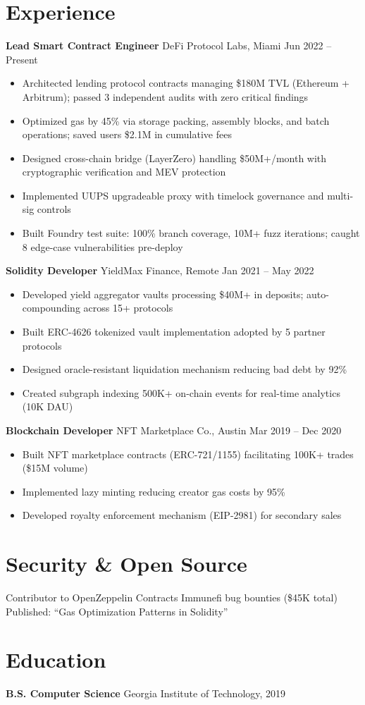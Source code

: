 \documentclass[10pt,a4paper]{article}
\begin{document}
\section{Experience}

\textbf{Lead Smart Contract Engineer} \quad\textbar\quad DeFi Protocol Labs, Miami \hfill Jun 2022 -- Present
\begin{itemize}
  \item Architected lending protocol contracts managing \$180M TVL (Ethereum + Arbitrum); passed 3 independent audits with zero critical findings
  \item Optimized gas by 45\% via storage packing, assembly blocks, and batch operations; saved users \$2.1M in cumulative fees
  \item Designed cross-chain bridge (LayerZero) handling \$50M+/month with cryptographic verification and MEV protection
  \item Implemented UUPS upgradeable proxy with timelock governance and multi-sig controls
  \item Built Foundry test suite: 100\% branch coverage, 10M+ fuzz iterations; caught 8 edge-case vulnerabilities pre-deploy
\end{itemize}

\textbf{Solidity Developer} \quad\textbar\quad YieldMax Finance, Remote \hfill Jan 2021 -- May 2022
\begin{itemize}
  \item Developed yield aggregator vaults processing \$40M+ in deposits; auto-compounding across 15+ protocols
  \item Built ERC-4626 tokenized vault implementation adopted by 5 partner protocols
  \item Designed oracle-resistant liquidation mechanism reducing bad debt by 92\%
  \item Created subgraph indexing 500K+ on-chain events for real-time analytics (10K DAU)
\end{itemize}

\textbf{Blockchain Developer} \quad\textbar\quad NFT Marketplace Co., Austin \hfill Mar 2019 -- Dec 2020
\begin{itemize}
  \item Built NFT marketplace contracts (ERC-721/1155) facilitating 100K+ trades (\$15M volume)
  \item Implemented lazy minting reducing creator gas costs by 95\%
  \item Developed royalty enforcement mechanism (EIP-2981) for secondary sales
\end{itemize}

\section{Security \& Open Source}
Contributor to OpenZeppelin Contracts \quad\textbar{} Immunefi bug bounties (\$45K total) \quad\textbar\quad Published: ``Gas Optimization Patterns in Solidity''

\section{Education}
\textbf{B.S. Computer Science} \hfill Georgia Institute of Technology, 2019
\end{document}
